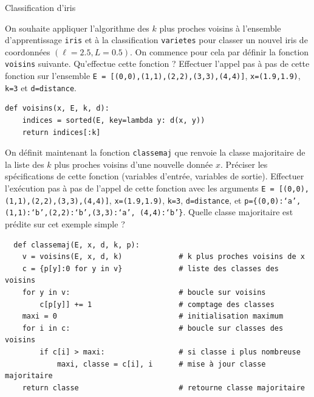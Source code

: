 \begin{exo}[PC][2][devoir]{Classification d'iris}
\begin{quest}
  \item On souhaite appliquer l'algorithme des $k$ plus proches voisins à l'ensemble d'apprentissage \texttt{iris} et à la classification \texttt{varietes} pour classer un nouvel iris de coordonnées $(\ell=2.5,L=0.5)$. On commence pour cela par définir la fonction \texttt{voisins} suivante. Qu'effectue cette fonction ? Effectuer l'appel pas à pas de cette fonction sur l'ensemble \texttt{E = [(0,0),(1,1),(2,2),(3,3),(4,4)]}, \texttt{x=(1.9,1.9)}, \texttt{k=3} et \texttt{d=distance}.
  \begin{verbatim}
def voisins(x, E, k, d):
    indices = sorted(E, key=lambda y: d(x, y))
    return indices[:k]
  \end{verbatim}
    \item On définit maintenant la fonction \texttt{classemaj} que renvoie la classe majoritaire de la liste des $k$ plus proches voisins d'une nouvelle donnée $x$. Préciser les spécifications de cette fonction (variables d'entrée, variables de sortie). Effectuer l'exécution pas à pas de l'appel de cette fonction avec les arguments \texttt{E = [(0,0),(1,1),(2,2),(3,3),(4,4)]}, \texttt{x=(1.9,1.9)}, \texttt{k=3}, \texttt{d=distance}, et \texttt{p=\{(0,0):`a',(1,1):`b',(2,2):`b',(3,3):`a', (4,4):`b'\}}. Quelle classe majoritaire est prédite sur cet exemple simple ?
  \begin{verbatim}
  def classemaj(E, x, d, k, p):
    v = voisins(E, x, d, k)             # k plus proches voisins de x
    c = {p[y]:0 for y in v}             # liste des classes des voisins
    for y in v:                         # boucle sur voisins
        c[p[y]] += 1                    # comptage des classes
    maxi = 0                            # initialisation maximum
    for i in c:                         # boucle sur classes des voisins
        if c[i] > maxi:                 # si classe i plus nombreuse
            maxi, classe = c[i], i      # mise à jour classe majoritaire
    return classe                       # retourne classe majoritaire
  \end{verbatim}
  \sol{
}
\end{quest}
\end{exo}
